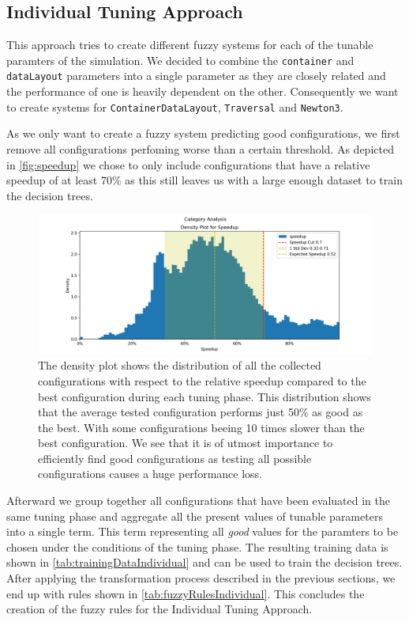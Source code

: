 \subsection{Individual Tuning Approach}

This approach tries to create different fuzzy systems for each of the tunable paramters of the simulation. We decided to combine the \texttt{container} and \texttt{dataLayout} parameters into a single parameter as they are closely related and the performance of one is heavily dependent on the other. Consequently we want to create systems for \texttt{ContainerDataLayout}, \texttt{Traversal} and \texttt{Newton3}.

As we only want to create a fuzzy system predicting good configurations, we first remove all configurations perfoming worse than a certain threshold. As depicted in \autoref{fig:speedup} we chose to only include configurations that have a relative speedup of at least 70\% as this still leaves us with a large enough dataset to train the decision trees.

\begin{figure}[H]
    \centering
    \includegraphics[width=\columnwidth,trim={1cm 0 2cm 1.5cm},clip]{figures/DataAnalytics/speedup.png}
    \caption[Speedup density plot of all configurations]{The density plot shows the distribution of all the collected configurations with respect to the relative speedup compared to the best configuration during each tuning phase. This distribution shows that the average tested configuration performs just 50\% as good as the best. With some configurations beeing 10 times slower than the best configuration.
        We see that it is of utmost importance to efficiently find good configurations as testing all possible configurations causes a huge performance loss.}
    \label{fig:speedup}
\end{figure}

Afterward we group together all configurations that have been evaluated in the same tuning phase and aggregate all the present values of tunable parameters into a single term. This term representing all \emph{good} values for the paramters to be chosen under the conditions of the tuning phase. The resulting training data is shown in \autoref{tab:trainingDataIndividual} and can be used to train the decision trees. After applying the transformation process described in the previous sections, we end up with rules shown in \autoref{tab:fuzzyRulesIndividual}. This concludes the creation of the fuzzy rules for the Individual Tuning Approach.




